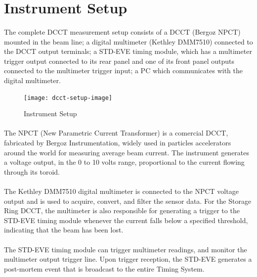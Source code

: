 \documentclass[openany]{article}
\begin{document}
\section{Instrument Setup}

	\paragraph{} The complete DCCT measurement setup consists of a DCCT (Bergoz NPCT) mounted in the beam line; a digital multimeter (Kethley DMM7510) connected to the DCCT output terminals; a STD-EVE timing module, which has a multimeter trigger output connected to its rear panel and one of its front panel outputs connected to the multimeter trigger input; a PC which communicates with the digital multimeter.

	\begin{figure}[!h]
		\caption{Instrument Setup}
		\label{fig:dcct-setup}
		\centering
		\texttt{[image: dcct-setup-image]}
	\end{figure}
\FloatBarrier

	\paragraph{} The NPCT (New Parametric Current Transformer) is a comercial DCCT, fabricated by Bergoz Instrumentation, widely used in particles accelerators around the world for measuring average beam current. The instrument generates a voltage output, in the 0 to 10 volts range, proportional to the current flowing through its toroid.

	\paragraph{} The Kethley DMM7510 digital multimeter is connected to the NPCT voltage output and is used to acquire, convert, and filter the sensor data. For the Storage Ring DCCT, the multimeter is also responsible for generating a trigger to the STD-EVE timing module whenever the current falls below a specified threshold, indicating that the beam has been lost.

	\paragraph{} The STD-EVE timing module can trigger multimeter readings, and monitor the multimeter output trigger line. Upon trigger reception, the STD-EVE generates a post-mortem event that is broadcast to the entire Timing System.
\end{document}
